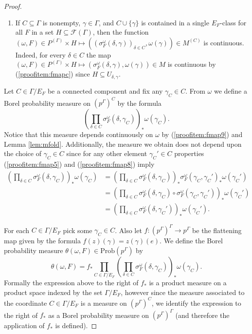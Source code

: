 \documentclass[10pt,a4paper]{amsart}
\def\cal{\mathcal}
\newcommand{\Prob}{\mathrm{Prob}}
\begin{document}
\begin{proof}
\begin{enumerate}
		\item \label{proofitem:fmap9} If $C \subseteq \Gamma$ is nonempty, $\gamma \in \Gamma$, and $C \cup \{\gamma\}$ is contained in a single $E_F$-class for all $F$ in a set $H \subseteq \cal F(\Gamma)$, then the function $(\omega, F) \in P^{(\Gamma)} \times H \mapsto ((\sigma_F^\omega(\delta, \gamma))_{\delta \in C}, \omega(\gamma)) \in M^{(C)}$ is continuous. Indeed, for every $\delta \in C$ the map $(\omega, F) \in P^{(\Gamma)} \times H \mapsto (\sigma_F^\omega(\delta, \gamma), \omega(\gamma)) \in M$ is continuous by (\ref{proofitem:fmapc}) since $H \subseteq U_{\delta, \gamma}$.
	\end{enumerate}
	
	Let $C \in \Gamma / E_F$ be a connected component and fix any $\gamma_C \in C$. From $\omega$ we define a Borel probability measure on $(p^\Gamma)^C$ by the formula
	\[\left( \prod_{\delta \in C} \sigma_F^\omega(\delta, \gamma_C) \right)_* \omega(\gamma_C).\]
	Notice that this measure depends continuously on $\omega$ by (\ref{proofitem:fmap9}) and Lemma \ref{lem:mfold}. Additionally, the measure we obtain does not depend upon the choice of $\gamma_C \in C$ since for any other element $\gamma_C' \in C$ properties (\ref{proofitem:fmap5}) and (\ref{proofitem:fmap8}) imply
	\begin{align*}
		\left(\prod_{\delta \in C} \sigma_F^\omega(\delta, \gamma_C) \right)_* \omega(\gamma_C) & = \left(\prod_{\delta \in C} \sigma_F^\omega(\delta, \gamma_C) \right)_* \sigma_F^\omega(\gamma_C, \gamma_C')_* \omega(\gamma_C')\\
		& = \left( \prod_{\delta \in C} \sigma_F^\omega(\delta, \gamma_C) \circ \sigma_F^\omega(\gamma_C, \gamma_C') \right)_* \omega(\gamma_C')\\
		& = \left( \prod_{\delta \in C} \sigma_F^\omega(\delta, \gamma_C') \right)_* \omega(\gamma_C').
	\end{align*}
	
	For each $C \in \Gamma / E_F$ pick some $\gamma_C \in C$. Also let $f : (p^\Gamma)^\Gamma \rightarrow p^\Gamma$ be the flattening map given by the formula $f(z)(\gamma) = z(\gamma)(e)$. We define the Borel probability measure $\theta(\omega, F) \in \Prob(p^\Gamma)$ by
	\[\theta(\omega, F) = f_* \prod_{C \in \Gamma / E_F} \left( \prod_{\delta \in C} \sigma_F^\omega(\delta, \gamma_C) \right)_* \omega(\gamma_C).\]
	Formally the expression above to the right of $f_*$ is a product measure on a product space indexed by the set $\Gamma / E_F$, however since the measure associated to the coordinate $C \in \Gamma / E_F$ is a measure on $(p^\Gamma)^C$, we identify the expression to the right of $f_*$ as a Borel probability measure on $(p^\Gamma)^\Gamma$ (and therefore the application of $f_*$ is defined).
	

\end{proof}
\end{document}
